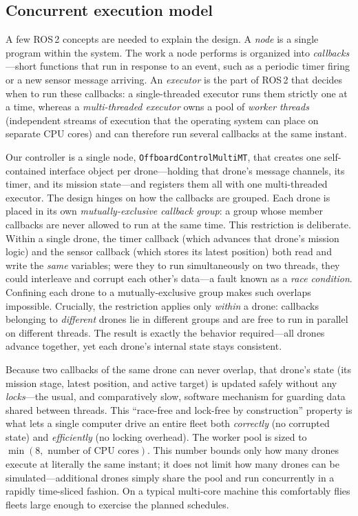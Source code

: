 \documentclass[subscriptcorrection,upint,nolists, varvw,barcolor=Goldenrod3,mathalfa=cal=euler,balance,hyphenate,french]{asmejour} %
\begin{document}
\subsection{Concurrent execution model}

A few ROS\,2 concepts are needed to explain the design. A \emph{node} is a single program within the system. The work a node performs is organized into \emph{callbacks}---short functions that run in response to an event, such as a periodic timer firing or a new sensor message arriving. An \emph{executor} is the part of ROS\,2 that decides when to run these callbacks: a single-threaded executor runs them strictly one at a time, whereas a \emph{multi-threaded executor} owns a pool of \emph{worker threads} (independent streams of execution that the operating system can place on separate CPU cores) and can therefore run several callbacks at the same instant.

Our controller is a single node, \texttt{OffboardControlMultiMT}, that creates one self-contained interface object per drone---holding that drone's message channels, its timer, and its mission state---and registers them all with one multi-threaded executor. The design hinges on how the callbacks are grouped. Each drone is placed in its own \emph{mutually-exclusive callback group}: a group whose member callbacks are never allowed to run at the same time. This restriction is deliberate. Within a single drone, the timer callback (which advances that drone's mission logic) and the sensor callback (which stores its latest position) both read and write the \emph{same} variables; were they to run simultaneously on two threads, they could interleave and corrupt each other's data---a fault known as a \emph{race condition}. Confining each drone to a mutually-exclusive group makes such overlaps impossible. Crucially, the restriction applies only \emph{within} a drone: callbacks belonging to \emph{different} drones lie in different groups and are free to run in parallel on different threads. The result is exactly the behavior required---all drones advance together, yet each drone's internal state stays consistent.

Because two callbacks of the same drone can never overlap, that drone's state (its mission stage, latest position, and active target) is updated safely without any \emph{locks}---the usual, and comparatively slow, software mechanism for guarding data shared between threads. This ``race-free and lock-free by construction'' property is what lets a single computer drive an entire fleet both \emph{correctly} (no corrupted state) and \emph{efficiently} (no locking overhead). The worker pool is sized to $\min(8,\text{ number of CPU cores})$. This number bounds only how many drones execute at literally the same instant; it does not limit how many drones can be simulated---additional drones simply share the pool and run concurrently in a rapidly time-sliced fashion. On a typical multi-core machine this comfortably flies fleets large enough to exercise the planned schedules.
\end{document}
